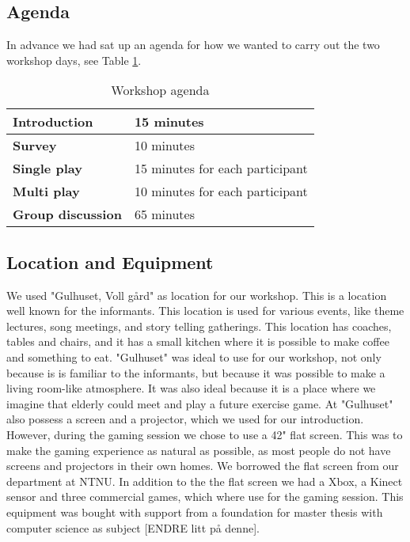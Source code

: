\subsection{Agenda}
In advance we had sat up an agenda for how we wanted to carry out the two workshop days, see Table \ref{tab:agenda}.  

\begin{table} [ht!]
\centering
    \begin{tabular}{|l|l|}
       \hline
       \textbf{Introduction} & 15 minutes  \\ \hline
       \textbf{Survey} & 10 minutes  \\ \hline
       \textbf{Single play} & 15 minutes for each participant \\ \hline
       \textbf{Multi play} & 10 minutes for each participant \\ \hline
	   \textbf{Group discussion} & 65 minutes \\ \hline
    \end{tabular}
    \caption[Workshop Agenda]{Workshop agenda}
    \label{tab:agenda}
\end{table} 

\subsection{Location and Equipment}
We used "Gulhuset, Voll gård" as location for our workshop. This is a location well known for the informants. This location is used for various events, like theme lectures, song meetings, and story telling gatherings. This location has coaches, tables and chairs, and it has a small kitchen where it is possible to make coffee and something to eat. "Gulhuset" was ideal to use for our workshop, not only because is is familiar to the informants, but because it was possible to make a living room-like atmosphere. It was also ideal because it is a place where we imagine that elderly could meet and play a future exercise game. At "Gulhuset" also possess a screen and a projector, which we used for our introduction. However, during the gaming session we chose to use a 42" flat screen. This was to make the gaming experience as natural as possible, as most people do not have screens and projectors in their own homes. We borrowed the flat screen from our department at NTNU. In addition to the the flat screen we had a Xbox, a Kinect sensor and three commercial games, which where use for the gaming session. This equipment was bought with support from a foundation for master thesis with computer science as subject [ENDRE litt på denne].   

